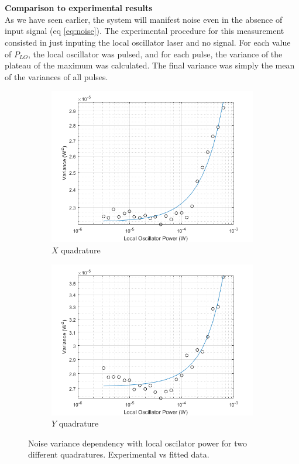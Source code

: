 \\
\\
{\bf Comparison to experimental results}\\
As we have seen earlier, the system will manifest noise even in the absence of input signal (eq \ref{eq:noise}). The experimental procedure for this measurement consisted in just inputing the local oscillator laser and no signal. For each value of  $P_{LO}$, the local oscillator was pulsed, and for each pulse, the variance of the plateau of the maximum was calculated. The final variance was simply the mean of the variances of all pulses.
%
\begin{figure}[H]
    \begin{subfigure}{.5\textwidth}
        \centering
        \includegraphics[width=.8\linewidth]{./sdf/quantum_noise/figures/noise_exp_channel1.png}
        \caption{$X$ quadrature}
        \label{fig:noise-exp-1}
    \end{subfigure}%
    \begin{subfigure}{.5\textwidth}
        \centering
        \includegraphics[width=.8\linewidth]{./sdf/quantum_noise/figures/noise_exp_channel3.png}
        \caption{$Y$ quadrature}
        \label{fig:noise-exp-3}
    \end{subfigure}
    \captionsetup{justification=centering}
    \caption{Noise variance dependency with local oscilator power for two different quadratures. Experimental vs fitted data.}
\end{figure}
